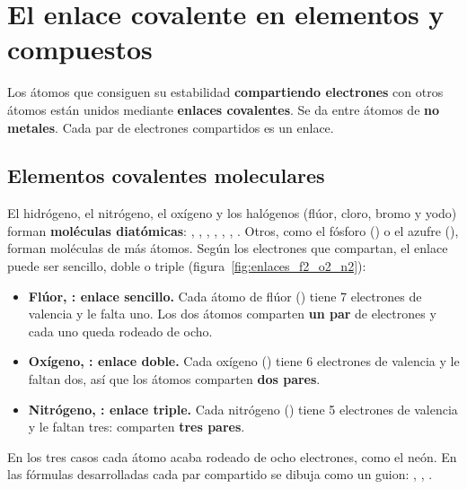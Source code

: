 \section{El enlace covalente en elementos y compuestos}

\begin{definition}
    Los átomos que consiguen su estabilidad \textbf{compartiendo electrones} con otros átomos están unidos mediante \textbf{enlaces covalentes}. Se da entre átomos de \textbf{no metales}. Cada par de electrones compartidos es un enlace.
\end{definition}

\subsection{Elementos covalentes moleculares}

El hidrógeno, el nitrógeno, el oxígeno y los halógenos (flúor, cloro, bromo y yodo) forman \textbf{moléculas diatómicas}: , , , , , , . Otros, como el fósforo () o el azufre (), forman moléculas de más átomos. Según los electrones que compartan, el enlace puede ser sencillo, doble o triple (figura~\ref{fig:enlaces_f2_o2_n2}):

\begin{itemize}
    \item \textbf{Flúor, : enlace sencillo.} Cada átomo de flúor () tiene 7 electrones de valencia y le falta uno. Los dos átomos comparten \textbf{un par} de electrones y cada uno queda rodeado de ocho.
    \item \textbf{Oxígeno, : enlace doble.} Cada oxígeno () tiene 6 electrones de valencia y le faltan dos, así que los átomos comparten \textbf{dos pares}.
    \item \textbf{Nitrógeno, : enlace triple.} Cada nitrógeno () tiene 5 electrones de valencia y le faltan tres: comparten \textbf{tres pares}.
\end{itemize}

En los tres casos cada átomo acaba rodeado de ocho electrones, como el neón. En las fórmulas desarrolladas cada par compartido se dibuja como un guion: , , .

